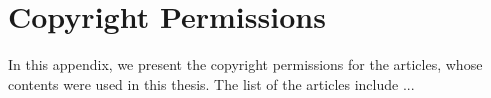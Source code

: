 \def\CHID{1a36}
\chapter{}\label{\CHID_app:a}
\lipsum[1]

\chapter{}\label{\CHID_app:b}
\lipsum[2]

\def\CHID{d4db}
\chapter{}\label{\CHID_app:1}
\lipsum[3]

\chapter{Copyright Permissions}  \label{app:copyright}
In this appendix, we present the copyright permissions for the articles, whose contents were used in this thesis. The list of the articles include ...